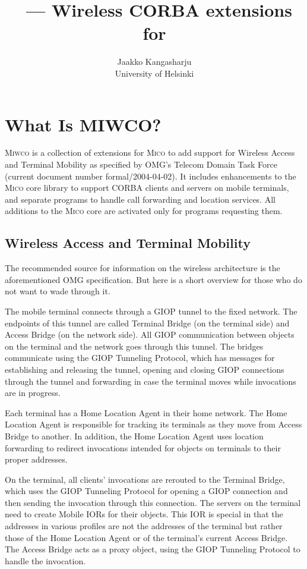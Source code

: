 \documentclass[12pt,a4paper,draft]{article}
\title{\MIWCO\ --- Wireless CORBA extensions for \MICO}
\author{Jaakko Kangasharju \\ University of Helsinki}
\newcommand{\MICO}{\textsc{Mico}}
\newcommand{\MIWCO}{\textsc{Miwco}}
\begin{document}
\maketitle

\section{What Is MIWCO?}

\MIWCO{} is a collection of extensions for \MICO{} to add support for
Wireless Access and Terminal Mobility as specified by OMG's Telecom
Domain Task Force (current document number formal/2004-04-02).  It
includes enhancements to the \MICO{} core library to support CORBA
clients and servers on mobile terminals, and separate programs to
handle call forwarding and location services.  All additions to the
\MICO{} core are activated only for programs requesting them.

\subsection{Wireless Access and Terminal Mobility}

The recommended source for information on the wireless architecture is
the aforementioned OMG specification.  But here is a short overview
for those who do not want to wade through it.

The mobile terminal connects through a GIOP tunnel to the fixed
network.  The endpoints of this tunnel are called Terminal Bridge (on
the terminal side) and Access Bridge (on the network side).  All GIOP
communication between objects on the terminal and the network goes
through this tunnel.  The bridges communicate using the GIOP Tunneling
Protocol, which has messages for establishing and releasing the
tunnel, opening and closing GIOP connections through the tunnel and
forwarding in case the terminal moves while invocations are in
progress.

Each terminal has a Home Location Agent in their home network.  The
Home Location Agent is responsible for tracking its terminals as they
move from Access Bridge to another.  In addition, the Home Location
Agent uses location forwarding to redirect invocations intended for
objects on terminals to their proper addresses.

On the terminal, all clients' invocations are rerouted to the Terminal
Bridge, which uses the GIOP Tunneling Protocol for opening a GIOP
connection and then sending the invocation through this connection.
The servers on the terminal need to create Mobile IORs for their
objects.  This IOR is special in that the addresses in various
profiles are not the addresses of the terminal but rather those of the
Home Location Agent or of the terminal's current Access Bridge.  The
Access Bridge acts as a proxy object, using the GIOP Tunneling
Protocol to handle the invocation.
\end{document}

